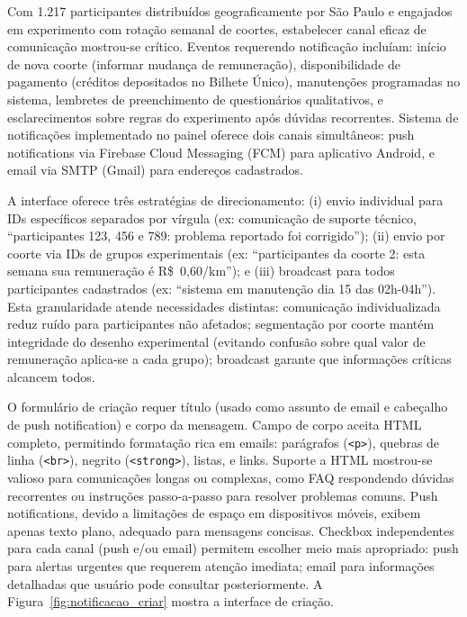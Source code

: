 

Com 1.217 participantes distribuídos geograficamente por São Paulo e engajados em experimento com rotação semanal de coortes, estabelecer canal eficaz de comunicação mostrou-se crítico. Eventos requerendo notificação incluíam: início de nova coorte (informar mudança de remuneração), disponibilidade de pagamento (créditos depositados no Bilhete Único), manutenções programadas no sistema, lembretes de preenchimento de questionários qualitativos, e esclarecimentos sobre regras do experimento após dúvidas recorrentes. Sistema de notificações implementado no painel oferece dois canais simultâneos: push notifications via Firebase Cloud Messaging (FCM) para aplicativo Android, e email via SMTP (Gmail) para endereços cadastrados.

A interface oferece três estratégias de direcionamento: (i) envio individual para IDs específicos separados por vírgula (ex: comunicação de suporte técnico, ``participantes 123, 456 e 789: problema reportado foi corrigido''); (ii) envio por coorte via IDs de grupos experimentais (ex: ``participantes da coorte 2: esta semana sua remuneração é R\$~0,60/km''); e (iii) broadcast para todos participantes cadastrados (ex: ``sistema em manutenção dia 15 das 02h-04h''). Esta granularidade atende necessidades distintas: comunicação individualizada reduz ruído para participantes não afetados; segmentação por coorte mantém integridade do desenho experimental (evitando confusão sobre qual valor de remuneração aplica-se a cada grupo); broadcast garante que informações críticas alcancem todos.

O formulário de criação requer título (usado como assunto de email e cabeçalho de push notification) e corpo da mensagem. Campo de corpo aceita HTML completo, permitindo formatação rica em emails: parágrafos (\texttt{<p>}), quebras de linha (\texttt{<br>}), negrito (\texttt{<strong>}), listas, e links. Suporte a HTML mostrou-se valioso para comunicações longas ou complexas, como FAQ respondendo dúvidas recorrentes ou instruções passo-a-passo para resolver problemas comuns. Push notifications, devido a limitações de espaço em dispositivos móveis, exibem apenas texto plano, adequado para mensagens concisas. Checkbox independentes para cada canal (push e/ou email) permitem escolher meio mais apropriado: push para alertas urgentes que requerem atenção imediata; email para informações detalhadas que usuário pode consultar posteriormente. A Figura~\ref{fig:notificacao_criar} mostra a interface de criação.

